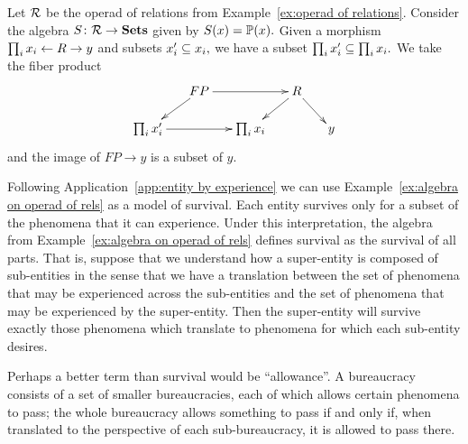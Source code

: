 \documentclass[../main/CT4S-EN-RU]{subfiles}
\begin{document}
\begin{applicationRUS}\label{app:entity by experience}
\end{applicationRUS}

\begin{exampleENG}\label{ex:algebra on operad of rels}
Let $\mcR$ be the operad of relations from Example~\ref{ex:operad of relations}. Consider the algebra $S\taking\mcR\to\Sets$ given by $S(x)=\PP(x).$ Given a morphism $\prod_ix_i\from R\to y$ and subsets $x_i'\ss x_i,$ we have a subset $\prod_ix_i'\ss\prod_ix_i.$ We take the fiber product
$$\xymatrix@=15pt{&FP\ar[rr]\ar[ld]&&R\ar[ld]\ar[rd]\\\prod_ix_i'\ar[rr]&&\prod_ix_i&&y}$$
and the image of $FP\to y$ is a subset of $y.$ 
\end{exampleENG}

\begin{exampleRUS}\label{ex:algebra on operad of rels}
\end{exampleRUS}

\begin{applicationENG}\label{app:desire}
Following Application~\ref{app:entity by experience} we can use Example~\ref{ex:algebra on operad of rels} as a model of survival. Each entity survives only for a subset of the phenomena that it can experience. Under this interpretation, the algebra from Example~\ref{ex:algebra on operad of rels} defines survival as the survival of all parts. That is, suppose that we understand how a super-entity is composed of sub-entities in the sense that we have a translation between the set of phenomena that may be experienced across the sub-entities and the set of phenomena that may be experienced by the super-entity. Then the super-entity will survive exactly those phenomena which translate to phenomena for which each sub-entity desires. 

Perhaps a better term than survival would be “allowance”. A bureaucracy consists of a set of smaller bureaucracies, each of which allows certain phenomena to pass; the whole bureaucracy allows something to pass if and only if, when translated to the perspective of each sub-bureaucracy, it is allowed to pass there.
\end{applicationENG}

\begin{applicationRUS}\label{app:desire}
\end{applicationRUS}
\end{document}
